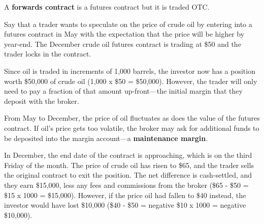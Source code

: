 \documentclass{article}
\begin{document}
    \begin{definition}[Forwards]
      A \textbf{forwards contract} is a futures contract but it is traded OTC. 
    \end{definition}

    \begin{example}
      Say that a trader wants to speculate on the price of crude oil by entering into a futures contract in May with the expectation that the price will be higher by year-end. The December crude oil futures contract is trading at \$50 and the trader locks in the contract.

      Since oil is traded in increments of 1,000 barrels, the investor now has a position worth \$50,000 of crude oil (1,000 x \$50 = \$50,000). However, the trader will only need to pay a fraction of that amount up-front—the initial margin that they deposit with the broker. 

      From May to December, the price of oil fluctuates as does the value of the futures contract. If oil's price gets too volatile, the broker may ask for additional funds to be deposited into the margin account—a \textbf{maintenance margin}.

      In December, the end date of the contract is approaching, which is on the third Friday of the month. The price of crude oil has risen to \$65, and the trader sells the original contract to exit the position. The net difference is cash-settled, and they earn \$15,000, less any fees and commissions from the broker (\$65 - \$50 = \$15 x 1000 = \$15,000). However, if the price oil had fallen to \$40 instead, the investor would have lost \$10,000 (\$40 - \$50 = negative \$10 x 1000 = negative \$10,000).
    \end{example}
\end{document}
